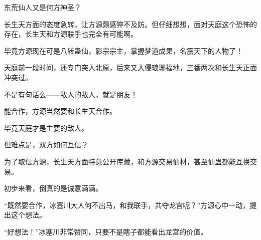 \begin{this_body}
东荒仙人又是何方神圣？

长生天方面的态度急转，让方源颇感猝不及防。但仔细想想，面对天庭这个恐怖的存在，长生天和方源联手也完全有可能啊。

毕竟方源现在可是八转蛊仙，影宗宗主，掌握梦道成果，名震天下的人物了！

天庭前一段时间，还专门突入北原，后来又入侵琅琊福地，三番两次和长生天正面冲突过。

不是有句话么——敌人的敌人，就是朋友！

能合作，方源当然要和长生天合作。

毕竟天庭才是主要的敌人。

但难点是，双方如何互信？

为了取信方源，长生天方面特意公开库藏，和方源交易仙材，甚至仙蛊都能互换交易。

初步来看，倒真的是诚意满满。

“既然要合作，冰塞川大人何不出马，和我联手，共夺龙宫呢？”方源心中一动，提出这个想法。

“好想法！”冰塞川非常赞同，只要不是瞎子都能看出龙宫的价值。

\end{this_body}

